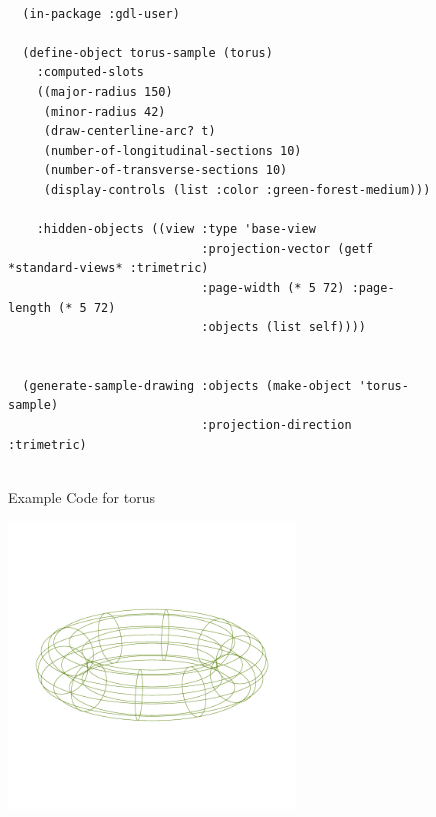 \documentclass [11pt]{book}
\begin{document}
\begin{itemize}
\begin{description}
\end{description}




\begin{figure}
\begin{lrbox}{\boxedverb}
\begin{minipage}{\linewidth}
{\small

\begin{verbatim}
  
  (in-package :gdl-user)
  
  (define-object torus-sample (torus)
    :computed-slots
    ((major-radius 150)
     (minor-radius 42)
     (draw-centerline-arc? t)
     (number-of-longitudinal-sections 10)
     (number-of-transverse-sections 10)
     (display-controls (list :color :green-forest-medium)))

    :hidden-objects ((view :type 'base-view
                           :projection-vector (getf *standard-views* :trimetric)
                           :page-width (* 5 72) :page-length (* 5 72)
                           :objects (list self))))
  

  (generate-sample-drawing :objects (make-object 'torus-sample) 
                           :projection-direction :trimetric)
                  

\end{verbatim}}
\end{minipage}
\end{lrbox}
\fbox{\usebox{\boxedverb}}

\caption{Example Code for torus}

\label{fig:example-code-torus}

\end{figure}

\begin{figure}
\begin{center}
\includegraphics[width=3in,height=3in]{../images/example-torus.pdf}
\end{center}


\end{figure}
\end{itemize}
\end{document}
